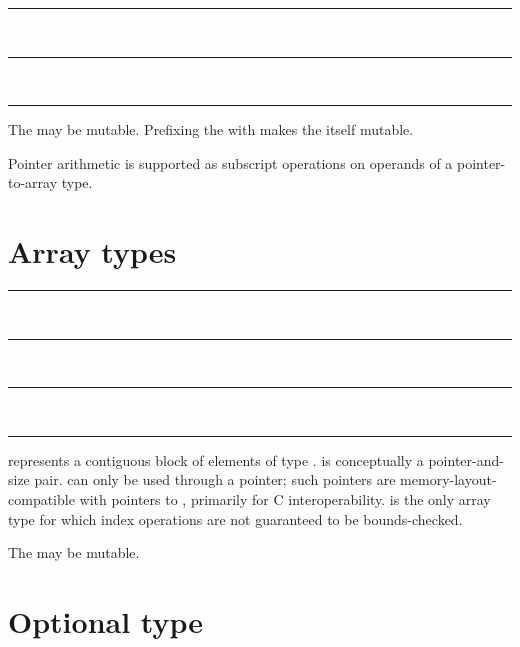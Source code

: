 \begin{grammar}
\rule{pointer-type}  \code{*}\\
\rule{pointer-type}   \code{*}\\
\rule{pointee-type} 
\end{grammar}

The  may be mutable. Prefixing the \code{*} with
 makes the  itself mutable.

\begin{samepage}
Pointer arithmetic is supported as subscript operations on operands of a
pointer-to-array type.

\end{samepage}

\section{Array types}

\begin{grammar}
\rule{array-type-with-constant-size}  \code{[}  \code{]}\\
\rule{array-type-with-runtime-size}  \code{[} \code{]}\\
\rule{array-type-with-unknown-size}  \code{[}  \code{]}\\
\rule{element-type} 
\end{grammar}

 represents a contiguous block of
 elements of type .
 is conceptually a pointer-and-size
pair.  can only be used through a
pointer; such pointers are memory-layout-compatible with pointers to
, primarily for C interoperability.
 is the only array type for which
index operations are not guaranteed to be bounds-checked.

The  may be mutable.

\section{Optional type}

